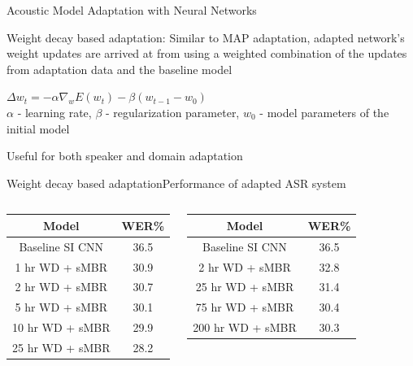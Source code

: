 \begin{frame} {Acoustic Model Adaptation with Neural Networks}

\alert{Weight decay based adaptation}: Similar to MAP adaptation, adapted network's weight updates are arrived at from using a  weighted combination of the updates from adaptation data and the baseline model
        \begin{center}
        $\Delta w_t = -\alpha{\nabla}_wE(w_t) - \beta(w_{t-1} - w_0)$ \\
        \vspace{1mm}
        \tiny{$\alpha$ - learning rate, $\beta$ - regularization parameter, $w_0$ - model parameters of the initial model}
        \end{center}
Useful for both \alert{speaker and domain adaptation}
\end{frame}

\begin{frame}{Weight decay based adaptation}{Performance of adapted ASR system}
\begin{columns}[T]
\column{2in}
\centering
{\color{orange}{Supervised Adaptation}}
\begin{center}
    \begin{tabular}{@{}cc@{}} \toprule
      {\bf Model} & {\bf WER\%} \\ \midrule
      Baseline SI CNN & 36.5 \\
      1 hr WD + sMBR & 30.9 \\
      2 hr WD + sMBR & 30.7  \\
      5 hr WD + sMBR & 30.1  \\
      10 hr WD + sMBR & 29.9  \\
      25 hr WD + sMBR & 28.2 \\ \bottomrule
    \end{tabular}
  \end{center}
\column{2in}
\centering
{\color{ForestGreen}{Unsupervised Adaptation}}
\begin{center}
    \begin{tabular}{@{}cc@{}} \toprule
      {\bf Model} & {\bf WER\%} \\ \midrule
      Baseline SI CNN & 36.5 \\
      2 hr WD + sMBR & 32.8 \\
      25 hr WD + sMBR & 31.4  \\
      75 hr WD + sMBR & 30.4  \\
      200 hr WD + sMBR & 30.3 \\ \bottomrule
    \end{tabular}
  \end{center}
\end{columns}
\end{frame}

